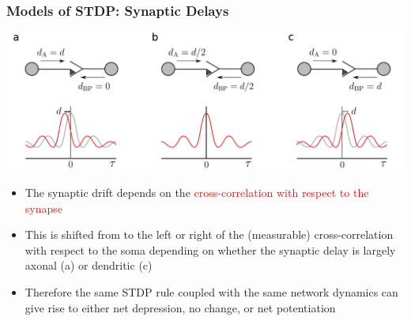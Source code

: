 \documentclass{beamer}
\begin{document}
\begin{frame}
  \frametitle{Models of STDP: Synaptic Delays}
  \begin{center}
    \includegraphics[width=\textwidth]{./figures/synaptic_delays}
  \end{center}
\begin{itemize}
  \item The synaptic drift depends on the \textcolor{red}{cross-correlation with respect to the synapse}
  \item This is shifted from to the left or right of the (measurable) \textcolor{dgray}{cross-correlation with respect to the soma} depending on whether the synaptic delay is largely axonal (a) or dendritic (c)
  \item Therefore the same STDP rule coupled with the same network dynamics can give rise to either net depression, no change, or net potentiation
\end{itemize}
\end{frame}
\end{document}
